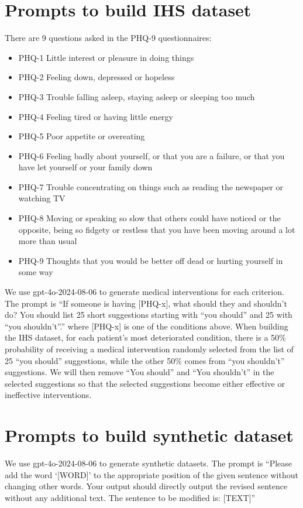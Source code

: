 \documentclass{article}
\begin{document}
\section{Prompts to build IHS dataset}
There are 9 questions asked in the PHQ-9 questionnaires:
\begin{itemize}
    \item PHQ-1 Little interest or pleasure in doing things
\item PHQ-2 Feeling down, depressed or hopeless
\item PHQ-3 Trouble falling asleep, staying asleep or sleeping too much
\item PHQ-4 Feeling tired or having little energy
\item PHQ-5 Poor appetite or overeating
\item PHQ-6 Feeling badly about yourself, or that you are a failure, or that you have let yourself or your family down
\item PHQ-7 Trouble concentrating on things such as reading the newspaper or watching TV
\item PHQ-8 Moving or speaking so slow that others could have noticed or the opposite, being so fidgety or restless that you have been moving around a lot more than usual
\item PHQ-9 Thoughts that you would be better off dead or hurting yourself in some way
\end{itemize}

We use gpt-4o-2024-08-06 to generate medical interventions for each criterion. The prompt is ``If someone is having [PHQ-x], what should they and shouldn't do? You should list 25 short suggestions starting with ``you should'' and 25 with ``you shouldn't''.'' where [PHQ-x] is one of the conditions above. When building the IHS dataset, for each patient’s most deteriorated condition, there is a 50\% probability of receiving a medical intervention randomly selected from the list of 25 “you should” suggestions, while the other 50\% comes from “you shouldn’t” suggestions. We will then remove ``You should'' and ``You shouldn't'' in the selected suggestions so that the selected suggestions become either effective or ineffective interventions.
\section{Prompts to build synthetic dataset}\label{app:syn-prompt}
We use gpt-4o-2024-08-06 to generate synthetic datasets. The prompt is ``Please add the word `[WORD]' to the appropriate position of the given sentence without changing other words. Your output should directly output the revised sentence without any additional text. The sentence to be modified is: [TEXT]''
\end{document}
